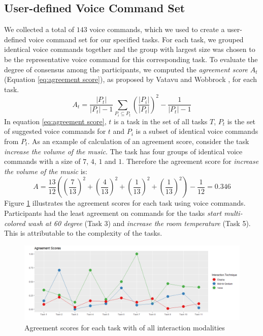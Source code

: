 \documentclass[sigchi]{acmart}
\begin{document}
	\subsection{User-defined Voice Command Set}
We collected a total of $143$ voice commands, which we used to create a user-defined voice command set for our specified tasks. For each task, we grouped identical voice commands together and the group with largest size was chosen to be the representative voice command for this corresponding task. To evaluate the degree of consensus among the participants, we computed the \textit{agreement score} $A_t$ (Equation \ref{eq:agreement score}), as proposed by Vatavu and Wobbrock \cite{Vatavu.2015}, for each task.
		\begin{equation}
			\label{eq:agreement score}
			A_t = \frac{|P_t|}{|P_t|-1} \sum_{P_i \subseteq P_t} \left(\frac{|P_i|}{|P_t|}\right)^2  - \frac{1}{|P_t|-1}
		\end{equation}
In equation \ref{eq:agreement score}, $t$ is a task in the set of all tasks $T$, $P_t$ is the set of suggested voice commands for $t$ and $P_i$ is a subset of identical voice commands from $P_t$. 
As an example of calculation of an agreement score, consider the task \textit{increase the volume of the music}. The task has four groups of identical voice commands with a size of $7$, $4$, $1$ and $1$. Therefore the agreement score for \textit{increase the volume of the music} is:
		\begin{equation}
			A = \frac{13}{12} \left(\left(\frac{7}{13}\right)^2 + \left(\frac{4}{13}\right)^2 + \left(\frac{1}{13}\right)^2 + \left(\frac{1}{13}\right)^2 \right)- \frac{1}{12} = 0.346
		\end{equation}
		Figure \ref{figure:ASall} illustrates the agreement scores for each task using voice commands. Participants had the least agreement on commands for the tasks \textit{start multi-colored wash at 60 degree} (Task 3) and \textit{increase the room temperature} (Task 5). This is attributable to the complexity of the tasks.
		\begin{figure}			
			\centering
			\includegraphics[width=\textwidth]{AgreementScoresAllTechniques}
			\caption{Agreement scores for each task with of all interaction modalities}
			\label{figure:ASall}
		\end{figure}
\end{document}

